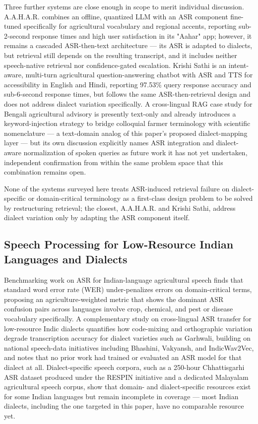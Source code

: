 \documentclass[conference]{IEEEtran}
\begin{document}
Three further systems are close enough in scope to merit individual discussion. A.A.H.A.R. \cite{dubey2025aahar} combines an offline, quantized LLM with an ASR component fine-tuned specifically for agricultural vocabulary and regional accents, reporting sub-2-second response times and high user satisfaction in its "Aahar" app; however, it remains a cascaded ASR-then-text architecture — its ASR is adapted to dialects, but retrieval still depends on the resulting transcript, and it includes neither speech-native retrieval nor confidence-gated escalation. Krishi Sathi \cite{vijayvargia2025krishisathi} is an intent-aware, multi-turn agricultural question-answering chatbot with ASR and TTS for accessibility in English and Hindi, reporting 97.53\% query response accuracy and sub-6-second response times, but follows the same ASR-then-retrieval design and does not address dialect variation specifically. A cross-lingual RAG case study for Bengali agricultural advisory \cite{hossain2026bengalirag} is presently text-only and already introduces a keyword-injection strategy to bridge colloquial farmer terminology with scientific nomenclature — a text-domain analog of this paper's proposed dialect-mapping layer — but its own discussion explicitly names ASR integration and dialect-aware normalization of spoken queries as future work it has not yet undertaken, independent confirmation from within the same problem space that this combination remains open.

None of the systems surveyed here treats ASR-induced retrieval failure on dialect-specific or domain-critical terminology as a first-class design problem to be solved by restructuring retrieval; the closest, A.A.H.A.R. and Krishi Sathi, address dialect variation only by adapting the ASR component itself.

\subsection{Speech Processing for Low-Resource Indian Languages and Dialects}

Benchmarking work on ASR for Indian-language agricultural speech \cite{benchmarkingasr2026} finds that standard word error rate (WER) under-penalizes errors on domain-critical terms, proposing an agriculture-weighted metric that shows the dominant ASR confusion pairs across languages involve crop, chemical, and pest or disease vocabulary specifically. A complementary study on cross-lingual ASR transfer for low-resource Indic dialects \cite{dialectmatters2026} quantifies how code-mixing and orthographic variation degrade transcription accuracy for dialect varieties such as Garhwali, building on national speech-data initiatives including Bhashini, Vakyansh, and IndicWav2Vec, and notes that no prior work had trained or evaluated an ASR model for that dialect at all. Dialect-specific speech corpora, such as a 250-hour Chhattisgarhi ASR dataset \cite{singh2023respin} produced under the RESPIN initiative and a dedicated Malayalam agricultural speech corpus, show that domain- and dialect-specific resources exist for some Indian languages but remain incomplete in coverage — most Indian dialects, including the one targeted in this paper, have no comparable resource yet.
\end{document}
